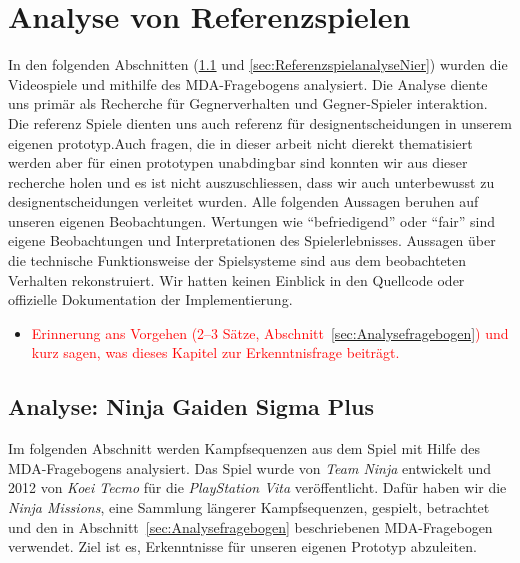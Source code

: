 \documentclass[../Main.tex]{subfiles}
\begin{document}
\section{Analyse von Referenzspielen} \label{sec:Referenzspielanalyse}

In den folgenden Abschnitten (\ref{sec:ReferenzspielanalyseNinja} und \ref{sec:ReferenzspielanalyseNier}) wurden die Videospiele  und  mithilfe des MDA-Fragebogens analysiert. Die Analyse diente uns primär als Recherche für Gegnerverhalten und Gegner-Spieler interaktion. Die referenz Spiele dienten uns auch referenz für designentscheidungen in unserem eigenen prototyp.Auch fragen, die in dieser arbeit nicht dierekt thematisiert werden aber für einen prototypen unabdingbar sind konnten wir aus dieser recherche holen und es ist nicht auszuschliessen, dass wir auch unterbewusst zu designentscheidungen verleitet wurden. Alle folgenden Aussagen beruhen auf unseren eigenen Beobachtungen. Wertungen wie \enquote{befriedigend} oder \enquote{fair} sind eigene Beobachtungen und Interpretationen des Spielerlebnisses. Aussagen über die technische Funktionsweise der Spielsysteme sind aus dem beobachteten Verhalten rekonstruiert. Wir hatten keinen Einblick in den Quellcode oder offizielle Dokumentation der Implementierung.

\begin{itemize}[leftmargin=1.5cm]
    \item \textcolor{red}{Erinnerung ans Vorgehen (2--3 Sätze, Abschnitt~\ref{sec:Analysefragebogen}) und kurz sagen, was dieses Kapitel zur Erkenntnisfrage beiträgt.}
\end{itemize}

\subsection{Analyse: Ninja Gaiden Sigma Plus} \label{sec:ReferenzspielanalyseNinja}

Im folgenden Abschnitt werden Kampfsequenzen aus dem Spiel  mit Hilfe des MDA-Fragebogens analysiert. Das Spiel wurde von \textit{Team Ninja} entwickelt und 2012 von \textit{Koei Tecmo} für die \textit{PlayStation Vita} veröffentlicht.\autocite{koeitechmo_ninjagaiden_2012} Dafür haben wir die \textit{Ninja Missions}, eine Sammlung längerer Kampfsequenzen, gespielt, betrachtet und den in Abschnitt~\ref{sec:Analysefragebogen} beschriebenen MDA-Fragebogen verwendet. Ziel ist es, Erkenntnisse für unseren eigenen Prototyp abzuleiten.
\end{document}
